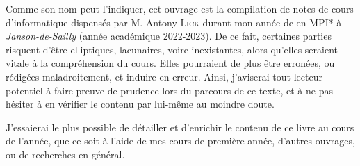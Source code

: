 \documentclass[a4paper,french,bookmarks]{book}
\begin{document}
    \newline\newline\newline
    
    \begin{center}
        \begin{minipage}{0.85\linewidth}
            \large \qquad Comme son nom peut l'indiquer, cet ouvrage est la compilation de notes de cours d'informatique dispensés par M. Antony \textsc{Lick} durant mon année de  en \textsf{MPI*} à \textit{Janson-de-Sailly} (année académique 2022-2023). De ce fait, certaines parties risquent d'être elliptiques, lacunaires, voire inexistantes, alors qu'elles seraient vitale à la compréhension du cours. Elles pourraient de plus être erronées, ou rédigées maladroitement, et induire en erreur.  Ainsi, j'aviserai tout lecteur potentiel à faire preuve de prudence lors du parcours de ce texte, et à ne pas hésiter à en vérifier le contenu par lui-même au moindre doute.\newline
            
            J'essaierai le plus possible de détailler et d'enrichir le contenu de ce livre au cours de l'année, que ce soit à l'aide de mes cours de première année, d'autres ouvrages, ou de recherches en général.
            
    
    

\end{minipage}
\end{center}
\end{document}
